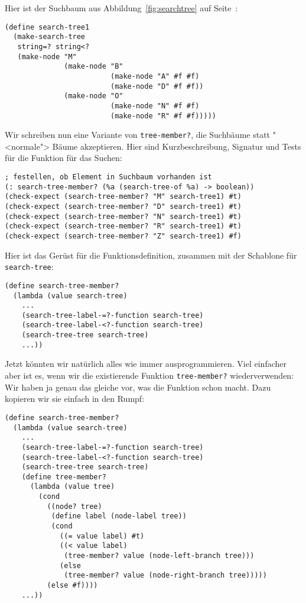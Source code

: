 Hier ist der Suchbaum aus Abbildung~\ref{fig:searchtree} auf
Seite~\pageref{fig:searchtree}:
%
\begin{lstlisting}
(define search-tree1
  (make-search-tree
   string=? string<?
   (make-node "M"
              (make-node "B"
                         (make-node "A" #f #f)
                         (make-node "D" #f #f))
              (make-node "O"
                         (make-node "N" #f #f)
                         (make-node "R" #f #f)))))
\end{lstlisting}
%
Wir schreiben nun eine Variante von \lstinline{tree-member?},
die Suchbäume statt "<normale"> Bäume
akzeptieren.  Hier sind Kurzbeschreibung, Signatur und Tests für die
Funktion für das Suchen:\label{func:search-tree-member}
%
\begin{lstlisting}
; festellen, ob Element in Suchbaum vorhanden ist
(: search-tree-member? (%a (search-tree-of %a) -> boolean))
(check-expect (search-tree-member? "M" search-tree1) #t)
(check-expect (search-tree-member? "D" search-tree1) #t)
(check-expect (search-tree-member? "N" search-tree1) #t)
(check-expect (search-tree-member? "R" search-tree1) #t)
(check-expect (search-tree-member? "Z" search-tree1) #f)
\end{lstlisting}
%
Hier ist das Gerüst für die Funktionsdefinition, zusammen mit der
Schablone für \lstinline{search-tree}:
%
\begin{lstlisting}
(define search-tree-member?
  (lambda (value search-tree)
    ...
    (search-tree-label-=?-function search-tree)
    (search-tree-label-<?-function search-tree)
    (search-tree-tree search-tree)
    ...))
\end{lstlisting}
%
Jetzt könnten wir natürlich alles wie immer ausprogrammieren.  Viel
einfacher aber ist es, wenn wir die existierende Funktion
\lstinline{tree-member?} wiederverwenden: Wir haben ja genau das
gleiche vor, was die Funktion schon macht.  Dazu kopieren wir sie
einfach in den Rumpf:
%
\begin{lstlisting}
(define search-tree-member?
  (lambda (value search-tree)
    ...
    (search-tree-label-=?-function search-tree)
    (search-tree-label-<?-function search-tree)
    (search-tree-tree search-tree)
    (define tree-member?
      (lambda (value tree)
        (cond
          ((node? tree)
           (define label (node-label tree))
           (cond
             ((= value label) #t)
             ((< value label)
              (tree-member? value (node-left-branch tree)))
             (else
              (tree-member? value (node-right-branch tree)))))
          (else #f))))
    ...))
\end{lstlisting}
